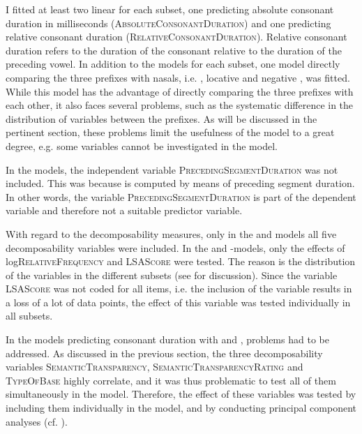I fitted at least two linear  for each subset, one predicting absolute consonant duration in milliseconds  (\textsc{AbsoluteConsonantDuration}) and one predicting relative consonant duration (\textsc{RelativeConsonantDuration}). Relative consonant duration refers to the duration of the consonant relative to the duration of the preceding vowel. In addition to the models for each subset, one model directly comparing the three prefixes with nasals, i.e. , locative  and negative , was fitted. While this model has the advantage of directly comparing the three prefixes with each other, it also faces several problems, such as the systematic difference in the distribution of variables between the prefixes. As will be discussed in the pertinent section, these problems limit the usefulness of the model to a great degree, e.g. some variables cannot be investigated in the model.

In the  models, the independent variable \textsc{PrecedingSegmentDuration} was not included. This was because  is computed by means of preceding segment duration. In other words, the variable \textsc{PrecedingSegmentDuration} is part of the dependent variable and therefore not a suitable predictor variable.


With regard to the decomposability measures, only in the  and models all five decomposability variables were included. In the  and -models, only the effects of log\textsc{RelativeFrequency} and \textsc{LSAScore} were tested. The reason is the distribution of the variables in the different subsets (see  for discussion). 
Since the variable \textsc{LSAScore} was not coded for all items, i.e. the inclusion of the variable results in a loss of a lot of data points, the effect of this variable was tested individually in all subsets. 

In the models predicting consonant duration with  and ,  problems had to be addressed. As discussed in the previous section, the three decomposability variables \textsc{SemanticTransparency}, \textsc{SemanticTransparencyRating} and \textsc{TypeOfBase} highly correlate, and it was thus problematic to test all of them simultaneously in the model. Therefore, the effect of these variables was tested by including them individually in the model, and by conducting principal component analyses (cf. ). 


